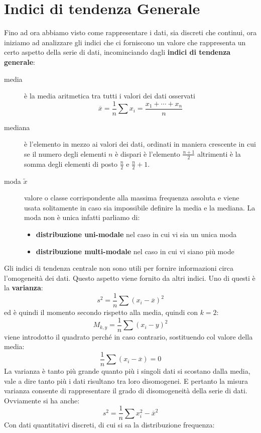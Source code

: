 \documentclass[a4paper,12pt, oneside]{book}
\begin{document}
\section{Indici di tendenza Generale}
Fino ad ora abbiamo visto come rappresentare i dati, sia discreti che continui, ora iniziamo ad analizzare gli indici
che ci forniscono un valore che rappresenta un certo aspetto della serie di dati, 
incominciando dagli \textbf{indici di tendenza generale}:
\begin{description}
    \item [media] è la media aritmetica tra tutti i valori dei dati osservati 
            \[ \overline{x} = \frac{1}{n} \sum x_i = \frac{x_1 + \cdots + x_n}{n} \]

    \item [mediana] è l'elemento in mezzo ai valori dei dati, ordinati in maniera crescente
            in cui se il numero degli elementi $n$ è dispari è l'elemento $\frac{n + 1}{2}$
            altrimenti è la somma degli elementi di posto $\frac{n}{2}$ e $\frac{n}{2} + 1$.

    \item [moda $\widetilde{x}$] valore o classe corrispondente alla massima frequenza assoluta e viene usata 
            solitamente in caso sia impossibile definire la media e la mediana.\newline
            La moda non è unica infatti parliamo di:
            \begin{itemize}
                 \item \textbf{distribuzione uni-modale} nel caso in cui vi sia un unica moda
                 \item \textbf{distribuzione multi-modale} nel caso in cui vi siano più mode
            \end{itemize}
\end{description}
Gli indici di tendenza centrale non sono utili per fornire informazioni circa l'omogeneità dei dati. Questo aspetto viene fornito da altri indici. Uno di questi è la \textbf{varianza}:
$$s^2=\frac{1}{n}\sum (x_i-\overline{x})^2$$
ed è quindi il momento secondo rispetto alla media, quindi con $k=2$:
$$M_{k,y}=\frac{1}{n}\sum (x_i-y)^2$$
viene introdotto il quadrato perché in caso contrario, sostituendo col valore della media:
$$\frac{1}{n}\sum (x_i-\overline{x})=0$$
La varianza è tanto più grande quanto più i singoli dati si scostano dalla media, vale a dire tanto più i dati risultano tra loro disomogenei. E pertanto la misura varianza consente di rappresentare il grado di disomogeneità della serie di dati. Ovviamente si ha anche:
$$s^2=\frac{1}{n}\sum x_i^2-\overline{x}^2$$
Con dati quantitativi discreti, di cui si sa la distribuzione frequenza:
\end{document}
